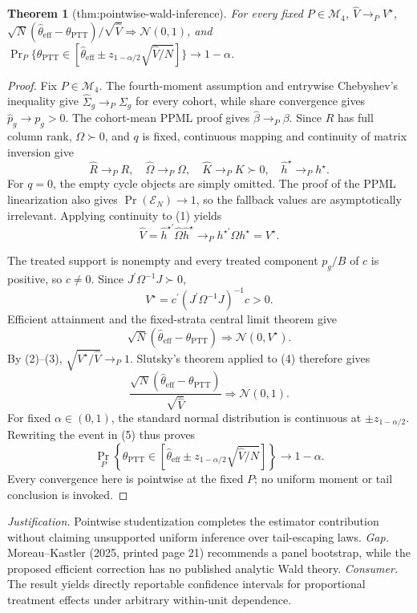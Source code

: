 \documentclass{article}
\newtheorem{theorem}{Theorem}
\begin{document}
\begin{theorem}[thm:pointwise-wald-inference]\label{thm:pointwise-wald-inference}
For every fixed \(P\in\mathcal M_4\), \(\widehat V\to_PV^{\star}\), \(\sqrt N(\widehat\theta_{\mathrm{eff}}-\theta_{\mathrm{PTT}})/\sqrt{\widehat V}\Rightarrow\mathcal N(0,1)\), and \(\Pr_P\{\theta_{\mathrm{PTT}}\in[\widehat\theta_{\mathrm{eff}}\pm z_{1-\alpha/2}\sqrt{\widehat V/N}]\}\to1-\alpha\).
\end{theorem}
\begin{proof}
Fix \(P\in\mathcal M_4\).  The fourth-moment assumption and entrywise Chebyshev's inequality give
\(\widehat\Sigma_g\to_P\Sigma_g\) for every cohort, while share convergence gives
\(\widehat p_g\to p_g>0\).  The cohort-mean PPML proof gives
\(\widehat\beta\to_P\beta\).  Since \(R\) has full column rank, \(\Omega\succ0\), and \(q\) is fixed, continuous mapping and continuity of matrix inversion give
\[
\widehat R\to_PR,
\quad
\widehat\Omega\to_P\Omega,
\quad
\widehat K\to_PK\succ0,
\quad
\widehat h^{\star}\to_Ph^{\star}.                                    \tag{1}
\]
For \(q=0\), the empty cycle objects are simply omitted.  The proof of the PPML linearization also gives
\(\Pr(\mathcal E_N)\to1\), so the fallback values are asymptotically irrelevant.  Applying continuity to (1) yields
\[
\widehat V
=\widehat h^{\star\prime}\widehat\Omega\widehat h^{\star}
\to_P h^{\star\prime}\Omega h^{\star}=V^{\star}.                     \tag{2}
\]

The treated support is nonempty and every treated component \(p_g/B\) of \(c\) is positive, so \(c\ne0\).  Since
\(J^{\prime}\Omega^{-1}J\succ0\),
\[
V^{\star}=c^{\prime}(J^{\prime}\Omega^{-1}J)^{-1}c>0.                 \tag{3}
\]
Efficient attainment and the fixed-strata central limit theorem give
\[
\sqrt N(\widehat\theta_{\mathrm{eff}}-\theta_{\mathrm{PTT}})
\Rightarrow\mathcal N(0,V^{\star}).                                   \tag{4}
\]
By (2)--(3), \(\sqrt{V^{\star}/\widehat V}\to_P1\).  Slutsky's theorem applied to (4) therefore gives
\[
\frac{\sqrt N(\widehat\theta_{\mathrm{eff}}-\theta_{\mathrm{PTT}})}
{\sqrt{\widehat V}}
\Rightarrow\mathcal N(0,1).                                           \tag{5}
\]
For fixed \(\alpha\in(0,1)\), the standard normal distribution is continuous at
\(\pm z_{1-\alpha/2}\).  Rewriting the event in (5) thus proves
\[
\Pr_P\!\left\{
\theta_{\mathrm{PTT}}\in
\left[\widehat\theta_{\mathrm{eff}}
\mathbin{\pm}z_{1-\alpha/2}\sqrt{\widehat V/N}\right]
\right\}\longrightarrow1-\alpha.
\]
Every convergence here is pointwise at the fixed \(P\); no uniform moment or tail conclusion is invoked.
\end{proof}
\par\smallskip\noindent \textit{Justification.} Pointwise studentization completes the estimator contribution without claiming unsupported uniform inference over tail-escaping laws. \textit{Gap.} Moreau--Kastler (2025, printed page 21) recommends a panel bootstrap, while the proposed efficient correction has no published analytic Wald theory. \textit{Consumer.} The result yields directly reportable confidence intervals for proportional treatment effects under arbitrary within-unit dependence.
\end{document}

